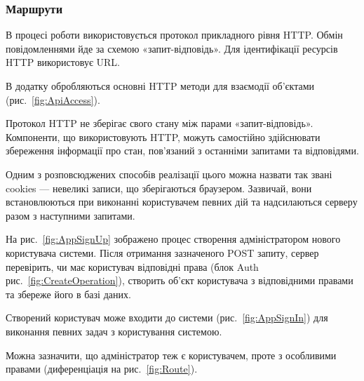 \subsubsection{Маршрути}


В процесі роботи використовується протокол прикладного рівня HTTP. Обмін повідомленнями йде за схемою «запит-відповідь». Для ідентифікації ресурсів HTTP використовує URL. 

В додатку обробляються основні  HTTP методи для взаємодії об’єктами (рис.~\ref{fig:ApiAccess}). 

Протокол HTTP не зберігає свого стану між парами «запит-відповідь». Компоненти, що використовують HTTP, можуть самостійно здійснювати збереження інформації про стан, пов'язаний з останніми запитами та відповідями. 

Одним з розповсюджених способів реалізації цього можна назвати так звані cookies — невеликі записи, що зберігаються браузером. Зазвичай, вони встановлюються при виконанні користувачем певних дій та надсилаються серверу разом з наступними запитами. 

На рис.~\ref{fig:AppSignUp} зображено процес створення адміністратором нового користувача системи. Після отримання зазначеного POST запиту, сервер перевірить, чи має користувач відповідні права (блок Auth рис.~\ref{fig:CreateOperation}), створить об’єкт користувача з відповідними правами та збереже його в базі даних.


Створений користувач може входити до системи (рис.~\ref{fig:AppSignIn}) для виконання певних задач з користування системою.


Можна зазначити, що адміністратор теж є користувачем, проте з особливими правами (диференціація на рис.~\ref{fig:Route}).

